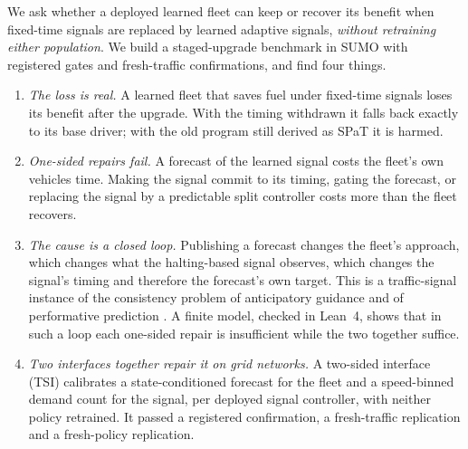 We ask whether a deployed learned fleet can keep or recover its benefit when fixed-time signals are replaced by learned adaptive signals,
\emph{without retraining either population}. We build a staged-upgrade benchmark in SUMO \cite{lopez2018} with registered gates and
fresh-traffic confirmations, and find four things.
\begin{enumerate}\setlength\itemsep{1pt}
\item \emph{The loss is real.} A learned fleet that saves fuel under fixed-time signals loses its benefit after the upgrade. With the
timing withdrawn it falls back exactly to its base driver; with the old program still derived as SPaT it is harmed.
\item \emph{One-sided repairs fail.} A forecast of the learned signal costs the fleet's own vehicles time. Making the signal commit to
its timing, gating the forecast, or replacing the signal by a predictable split controller costs more than the fleet recovers.
\item \emph{The cause is a closed loop.} Publishing a forecast changes the fleet's approach, which changes what the halting-based signal
observes, which changes the signal's timing and therefore the forecast's own target. This is a traffic-signal instance of the consistency
problem of anticipatory guidance \cite{bottom2000} and of performative prediction \cite{perdomo2020,narang2023}. A finite model, checked
in Lean~4, shows that in such a loop each one-sided repair is insufficient while the two together suffice.
\item \emph{Two interfaces together repair it on grid networks.} A two-sided interface (TSI) calibrates a state-conditioned forecast for
the fleet and a speed-binned demand count for the signal, per deployed signal controller, with neither policy retrained. It passed a
registered confirmation, a fresh-traffic replication and a fresh-policy replication.
\end{enumerate}

